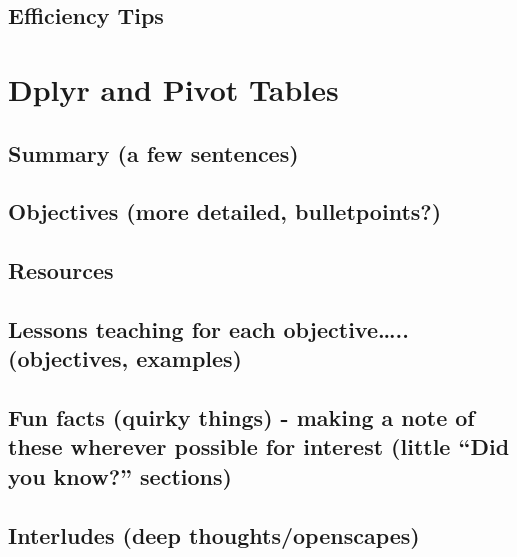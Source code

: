 \documentclass[]{book}
\begin{document}
\hypertarget{efficiency-tips-2}{%
\section{Efficiency Tips}\label{efficiency-tips-2}}

\hypertarget{pivot}{%
\chapter{Dplyr and Pivot Tables}\label{pivot}}

\hypertarget{summary-a-few-sentences-3}{%
\section{Summary (a few sentences)}\label{summary-a-few-sentences-3}}

\hypertarget{objectives-more-detailed-bulletpoints-3}{%
\section{Objectives (more detailed, bulletpoints?)}\label{objectives-more-detailed-bulletpoints-3}}

\hypertarget{resources-3}{%
\section{Resources}\label{resources-3}}

\hypertarget{lessons-teaching-for-each-objective..-objectives-examples-2}{%
\section{Lessons teaching for each objective\ldots{}.. (objectives, examples)}\label{lessons-teaching-for-each-objective..-objectives-examples-2}}

\hypertarget{fun-facts-quirky-things---making-a-note-of-these-wherever-possible-for-interest-little-did-you-know-sections-2}{%
\section{Fun facts (quirky things) - making a note of these wherever possible for interest (little ``Did you know?'' sections)}\label{fun-facts-quirky-things---making-a-note-of-these-wherever-possible-for-interest-little-did-you-know-sections-2}}

\hypertarget{interludes-deep-thoughtsopenscapes-3}{%
\section{Interludes (deep thoughts/openscapes)}\label{interludes-deep-thoughtsopenscapes-3}}
\end{document}
